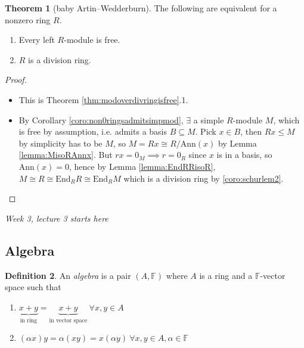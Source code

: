 \documentclass[a4paper]{article}
\newcommand{\F}{\mathbb{F}}
\newcommand{\Ann}{\text{Ann}}
\newcommand{\End}{\text{End}}
\theoremstyle{definition}
\newtheorem{defn}{Definition}[subsection]
\newtheorem{thm}[defn]{Theorem}
\begin{document}
\begin{thm}[baby Artin–Wedderburn]
The following are equivalent for a nonzero ring $R$.
\begin{enumerate}
\item Every left $R$-module is free.
\item $R$ is a division ring.
\end{enumerate}
\end{thm}
\begin{proof}
\begin{itemize}
\item[2$\Rightarrow$1:] This is Theorem \ref{thm:modoverdivringisfree}.1.
\item[1$\Rightarrow$2:] By Corollary \ref{coro:non0ringsadmitsimpmod}, $\exists$ a simple $R$-module $M$, which is free by assumption, i.e. admits a basis $B\subseteq M$. Pick $x\in B$, then $Rx\leq M$ by simplicity has to be $M$, so $M=Rx\cong R/\Ann(x)$ by Lemma \ref{lemma:MisoRAnnx}. But $rx=0_M\implies r=0_R$ since $x$ is in a basis, so $\Ann(x)=0$, hence by Lemma \ref{lemma:EndRRisoR}, $M\cong R\cong \End_RR\cong\End_RM$ which is a division ring by \ref{coro:schurlem2}.
\end{itemize}
\end{proof}

\begin{flushright}
\textit{Week 3, lecture 3 starts here}
\end{flushright}

\subsection{Algebra}
\begin{defn}
An \textit{algebra} is a pair $(A,\F)$ where $A$ is a ring and a $\F$-vector space such that
\begin{enumerate}
\item $\underbrace{x+y}_{\text{in ring}}=\underbrace{x+y}_{\text{in vector space}} \ \forall x,y\in A$
\item $(\alpha x)y=\alpha(xy)=x(\alpha y) \ \forall x,y\in A,\alpha\in\F$
\end{enumerate}
\end{defn}
\end{document}
